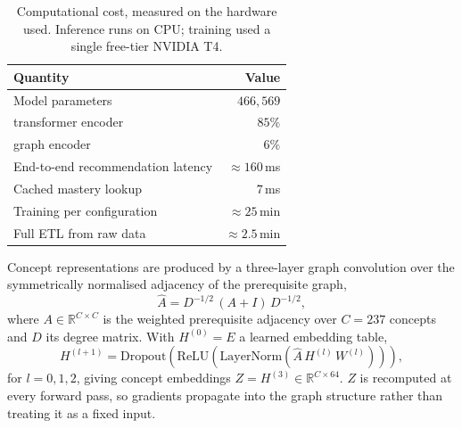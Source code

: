 \begin{table}[t]
\centering
\caption{Computational cost, measured on the hardware used. Inference runs on CPU;
training used a single free-tier NVIDIA T4.}
\label{tab:efficiency}
\begin{tabular}{lr}
\toprule
Quantity & Value \\
\midrule
Model parameters                     & $466{,}569$ \\
\quad transformer encoder            & $85\%$ \\
\quad graph encoder                  & $6\%$ \\
End-to-end recommendation latency    & ${\approx}160$\,ms \\
Cached mastery lookup                & $7$\,ms \\
Training per configuration           & ${\approx}25$\,min \\
Full ETL from raw data               & ${\approx}2.5$\,min \\
\bottomrule
\end{tabular}
\end{table}



Concept representations are produced by a three-layer graph convolution over the
symmetrically normalised adjacency of the prerequisite graph,
%
\begin{equation}
\hat{A} = D^{-1/2}\,(A + I)\,D^{-1/2},
\label{eq:adjacency}
\end{equation}
%
where $A \in \mathbb{R}^{C \times C}$ is the weighted prerequisite adjacency over
$C = 237$ concepts and $D$ its degree matrix. With $H^{(0)} = E$ a learned embedding
table,
%
\begin{equation}
H^{(l+1)} = \mathrm{Dropout}\!\left(\mathrm{ReLU}\!\left(\mathrm{LayerNorm}\!\left(
\hat{A}\,H^{(l)}\,W^{(l)}\right)\right)\right),
\label{eq:gcn}
\end{equation}
%
for $l = 0,1,2$, giving concept embeddings $Z = H^{(3)} \in \mathbb{R}^{C \times 64}$.
$Z$ is recomputed at every forward pass, so gradients propagate into the graph
structure rather than treating it as a fixed input.

